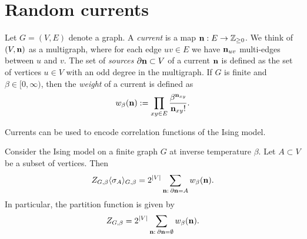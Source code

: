 \section{Random currents}

\begin{definition}[Currents]
    Let $G=(V,E)$ denote a graph.
    A \emph{current} is a map $\mathbf{n}:E\to\mathbb Z_{\geq 0}$.
    We think of $(V,\mathbf{n})$ as a multigraph,
    where for each edge $uv\in E$ we have $\mathbf{n}_{uv}$ multi-edges between $u$ and $v$.
    The set of \emph{sources} $\partial\mathbf{n}\subset V$ of a current
    $\mathbf{n}$ is defined as the set of vertices $u\in V$ with an odd degree in the multigraph.
    If $G$ is finite and $\beta\in[0,\infty)$, then the
    \emph{weight} of a current is defined as
    \[
        w_\beta(\mathbf{n}):=\prod_{xy\in E}
        \frac{\beta^{\mathbf{n}_{xy}}}{\mathbf{n}_{xy}!}.
    \]
\end{definition}

Currents can be used to encode correlation functions of the Ising model.

\begin{theorem}
    \label{thm:current_representation_of_correlation_functions}
    Consider the Ising model on a finite graph $G$ at inverse temperature $\beta$.
    Let $A\subset V$ be a subset of vertices.
    Then
    \[
        Z_{G,\beta}\langle\sigma_A\rangle_{G,\beta}
        =2^{|V|}\sum_{\mathbf{n}:\:\partial\mathbf{n}=A}
        w_\beta(\mathbf{n}).
    \]
    In particular, the partition function is given by
    \[
        Z_{G,\beta}=2^{|V|}\sum_{\mathbf{n}:\:\partial\mathbf{n}=\emptyset}
        w_\beta(\mathbf{n}).
    \]
\end{theorem}

